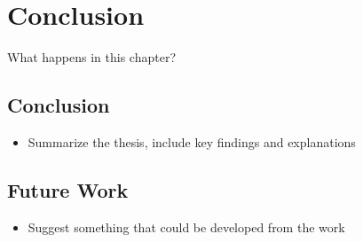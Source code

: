 \chapter{Conclusion}\label{chp:conclusion}

What happens in this chapter?

\section{Conclusion}
\begin{itemize}
\item Summarize the thesis, include key findings and explanations
\end{itemize}

\section{Future Work}
\begin{itemize}
\item Suggest something that could be developed from the work
\end{itemize}



